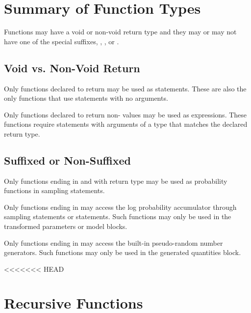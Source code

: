 \section{Summary of Function Types}

Functions may have a void or non-void return type and they may or may
not have one of the special suffixes, , , or
.

\subsection{Void vs. Non-Void Return}

Only functions declared to return  may be used as
statements.  These are also the only functions that use 
statements with no arguments.

Only functions declared to return non- values may be used
as expressions.  These functions require  statements with
arguments of a type that matches the declared return type.

\subsection{Suffixed or Non-Suffixed}

Only functions ending in  and with return type 
may be used as probability functions in sampling statements. 

Only functions ending in  may access the log probability
accumulator through sampling statements or
 statements.  Such functions may only be
used in the transformed parameters or model blocks.

Only functions ending in  may access the built-in
pseudo-random number generators.  Such functions may only be used in
the generated quantities block.


<<<<<<< HEAD
\section{Recursive Functions}

